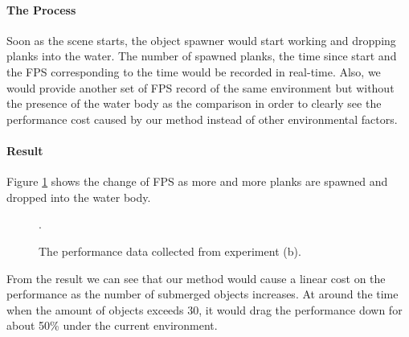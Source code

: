 \paragraph*{The Process}

Soon as the scene starts, the object spawner would start working and dropping planks into the water.
The number of spawned planks, the time since start and the FPS corresponding to the time would be recorded in real-time.
Also, we would provide another set of FPS record of the same environment but without the presence of the water body as the comparison in order to clearly see the performance cost caused by our method instead of other environmental factors.

\paragraph*{Result}

Figure \ref{experiment-spawner} shows the change of FPS as more and more planks are spawned and dropped into the water body.

\begin{figure}[h]
	\centering
	\caption{The performance data collected from experiment (b).}.
	\label{experiment-spawner}
\end{figure}

From the result we can see that our method would cause a linear cost on the performance as the number of submerged objects increases.
At around the time when the amount of objects exceeds 30, it would drag the performance down for about 50\% under the current environment.

